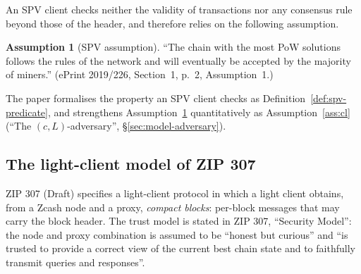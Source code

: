 \documentclass[11pt,a4paper]{article}
\theoremstyle{definition}
\newtheorem{assumption}[theorem]{Assumption}
\begin{document}
An SPV client checks neither the validity of transactions nor any consensus
rule beyond those of the header, and therefore relies on the following
assumption.

\begin{assumption}[SPV assumption]\label{ass:spv}
``The chain with the most PoW solutions follows the rules of the network
and will eventually be accepted by the majority of miners.''
(ePrint 2019/226, Section~1, p.~2, Assumption~1.)
\end{assumption}

The paper formalises the property an SPV client checks as
Definition~\ref{def:spv-predicate}, and strengthens
Assumption~\ref{ass:spv} quantitatively as Assumption~\ref{ass:cl} (``The
$(c, L)$-adversary'', \S\ref{sec:model-adversary}).

\subsection{The light-client model of ZIP 307}\label{sec:problem-zip307}

ZIP 307 (Draft) specifies a light-client protocol in which a light client
obtains, from a Zcash node and a proxy, \emph{compact blocks}: per-block
messages that may carry the block header. The trust model is stated in
ZIP 307, ``Security Model'': the node and proxy combination is assumed to be
``honest but curious'' and ``is trusted to provide a correct view of the
current best chain state and to faithfully transmit queries and
responses''.
\end{document}
